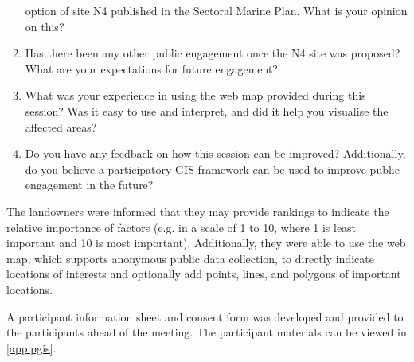 \begin{enumerate}[noitemsep]
  option of site N4 published in the Sectoral Marine Plan. What is your opinion
  on this?
  \item Has there been any other public engagement once the N4 site was
  proposed? What are your expectations for future engagement?
  \item What was your experience in using the web map provided during this
  session? Was it easy to use and interpret, and did it help you visualise the
  affected areas?
  \item Do you have any feedback on how this session can be improved?
  Additionally, do you believe a participatory GIS framework can be used to
  improve public engagement in the future?
\end{enumerate}

The landowners were informed that they may provide rankings to indicate the
relative importance of factors (e.g. in a scale of 1 to 10, where 1 is least
important and 10 is most important). Additionally, they were able to use the
web map, which supports anonymous public data collection, to directly indicate
locations of interests and optionally add points, lines, and polygons of
important locations.

A participant information sheet and consent form was developed and provided to
the participants ahead of the meeting. The participant materials can be viewed
in \autoref{app:pgis}.
